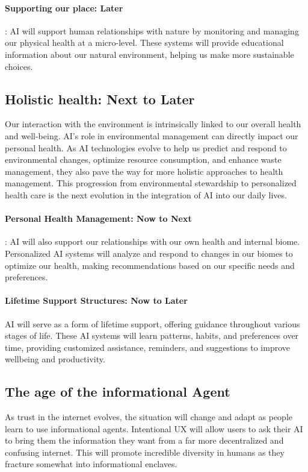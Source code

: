 \paragraph{Supporting our place: Later}: 
AI will support human relationships with nature by monitoring and managing our physical health at a micro-level. These systems will provide educational information about our natural environment, helping us make more sustainable choices.
\subsection{Holistic health: Next to Later}
Our interaction with the environment is intrinsically linked to our overall health and well-being. AI’s role in environmental management can directly impact our personal health. As AI technologies evolve to help us predict and respond to environmental changes, optimize resource consumption, and enhance waste management, they also pave the way for more holistic approaches to health management. This progression from environmental stewardship to personalized health care is the next evolution in the integration of AI into our daily lives.
\paragraph{Personal Health Management: Now to Next}: 
AI will also support our relationships with our own health and internal biome. Personalized AI systems will analyze and respond to changes in our biomes to optimize our health, making recommendations based on our specific needs and preferences.
\paragraph{Lifetime Support Structures: Now to Later}
AI will serve as a form of lifetime support, offering guidance throughout various stages of life. These AI systems will learn patterns, habits, and preferences over time, providing customized assistance, reminders, and suggestions to improve wellbeing and productivity.
\subsection{The age of the informational Agent}
As trust in the internet evolves, the situation will change and adapt as people learn to use informational agents. Intentional UX will allow users to ask their AI to bring them the information they want from a far more decentralized and confusing internet. This will promote incredible diversity in humans as they fracture somewhat into informational enclaves.

